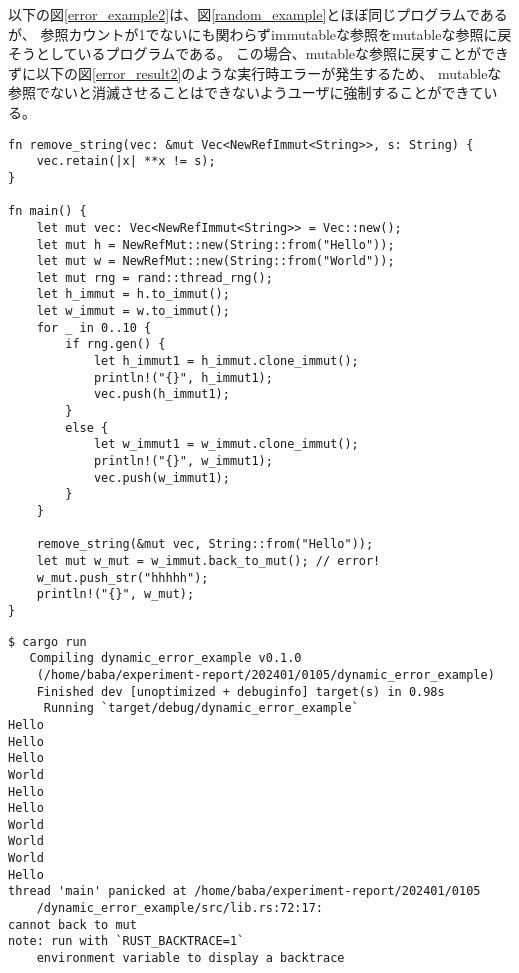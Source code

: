 \documentclass{sumiilab-paper}
\theoremstyle{mystyle}
\numberwithin{definition}{chapter} %
\begin{document}
以下の図\ref{error_example2}は、図\ref{random_example}とほぼ同じプログラムであるが、
参照カウントが1でないにも関わらずimmutableな参照をmutableな参照に戻そうとしているプログラムである。
この場合、mutableな参照に戻すことができずに以下の図\ref{error_result2}のような実行時エラーが発生するため、
mutableな参照でないと消滅させることはできないようユーザに強制することができている。
\begin{lstlisting}[caption=Mutableな参照へ戻せないことを検出する例, 
  label=error_example2, captionpos=b]
fn remove_string(vec: &mut Vec<NewRefImmut<String>>, s: String) {
    vec.retain(|x| **x != s);
}

fn main() {
    let mut vec: Vec<NewRefImmut<String>> = Vec::new();
    let mut h = NewRefMut::new(String::from("Hello"));
    let mut w = NewRefMut::new(String::from("World"));
    let mut rng = rand::thread_rng();
    let h_immut = h.to_immut();
    let w_immut = w.to_immut();
    for _ in 0..10 {
        if rng.gen() {
            let h_immut1 = h_immut.clone_immut();
            println!("{}", h_immut1);
            vec.push(h_immut1);
        }
        else {
            let w_immut1 = w_immut.clone_immut();
            println!("{}", w_immut1);
            vec.push(w_immut1);
        }
    }

    remove_string(&mut vec, String::from("Hello"));
    let mut w_mut = w_immut.back_to_mut(); // error!
    w_mut.push_str("hhhhh");
    println!("{}", w_mut);
}
\end{lstlisting}
\begin{lstlisting}[caption=Mutableな参照に戻し忘れた際のエラー, 
  label=error_result2, captionpos=b]
$ cargo run
   Compiling dynamic_error_example v0.1.0
    (/home/baba/experiment-report/202401/0105/dynamic_error_example)
    Finished dev [unoptimized + debuginfo] target(s) in 0.98s
     Running `target/debug/dynamic_error_example`
Hello
Hello
Hello
World
Hello
Hello
World
World
World
Hello
thread 'main' panicked at /home/baba/experiment-report/202401/0105
    /dynamic_error_example/src/lib.rs:72:17:
cannot back to mut
note: run with `RUST_BACKTRACE=1` 
    environment variable to display a backtrace
\end{lstlisting}
\end{document}
